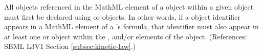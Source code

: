 All \Species objects referenced in the MathML  element of a
\KineticLaw object within a given \Reaction object must first be declared
using \SpeciesReference or \ModifierSpeciesReference objects.  In other
words, if a \Species object identifier appears in a MathML 
element of a \Reaction's \KineticLaw formula, that identifier must also
appear in at least one \SpeciesReference or \ModifierSpeciesReference
object within the ,  and/or
 elements of the \Reaction object.  (References:
SBML L3V1 Section \ref{subsec:kinetic-law}.)
